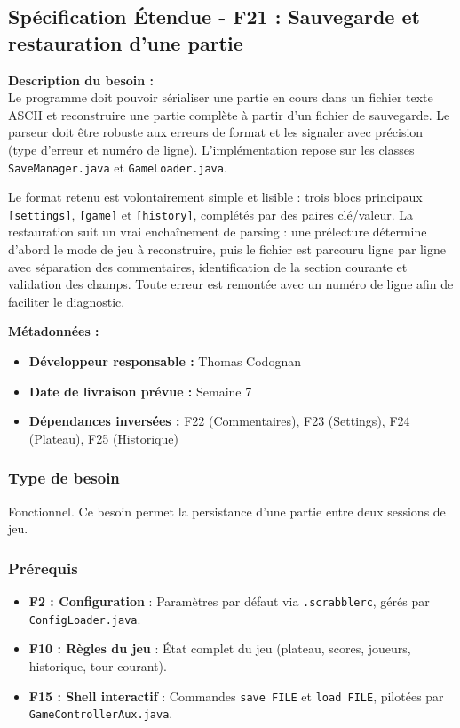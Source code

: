 \documentclass[a4paper]{article}
\begin{document}
\subsection{Spécification Étendue - F21 : Sauvegarde et restauration d'une partie}

\begin{besoinbox}
    \textbf{\large Description du besoin :} \\

    Le programme doit pouvoir sérialiser une partie en cours dans un fichier texte ASCII et reconstruire une partie complète à partir d'un fichier de sauvegarde. Le parseur doit être robuste aux erreurs de format et les signaler avec précision (type d'erreur et numéro de ligne). L'implémentation repose sur les classes \texttt{SaveManager.java} et \texttt{GameLoader.java}.

    Le format retenu est volontairement simple et lisible : trois blocs principaux \texttt{[settings]}, \texttt{[game]} et \texttt{[history]}, complétés par des paires clé/valeur. La restauration suit un vrai enchaînement de parsing : une prélecture détermine d'abord le mode de jeu à reconstruire, puis le fichier est parcouru ligne par ligne avec séparation des commentaires, identification de la section courante et validation des champs. Toute erreur est remontée avec un numéro de ligne afin de faciliter le diagnostic.

    \vspace{3mm}
    \textbf{Métadonnées :}
    \begin{itemize}
        \item \textbf{Développeur responsable :} Thomas Codognan
        \item \textbf{Date de livraison prévue :} Semaine 7
        \item \textbf{Dépendances inversées :} F22 (Commentaires), F23 (Settings), F24 (Plateau), F25 (Historique)
    \end{itemize}
\end{besoinbox}

\subsubsection{Type de besoin}
Fonctionnel. Ce besoin permet la persistance d'une partie entre deux sessions de jeu.

\subsubsection{Prérequis}
\begin{itemize}
    \item \textbf{F2 : Configuration} : Paramètres par défaut via \texttt{.scrabblerc}, gérés par \texttt{ConfigLoader.java}.
    \item \textbf{F10 : Règles du jeu} : État complet du jeu (plateau, scores, joueurs, historique, tour courant).
    \item \textbf{F15 : Shell interactif} : Commandes \texttt{save FILE} et \texttt{load FILE}, pilotées par \texttt{GameControllerAux.java}.
\end{itemize}
\end{document}
